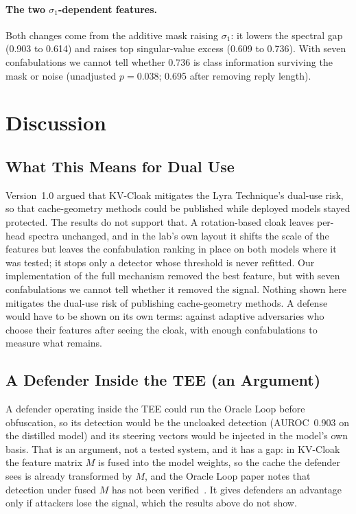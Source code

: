 \paragraph{The two $\sigma_1$-dependent features.}
Both changes come from the additive mask raising $\sigma_1$: it lowers
the spectral gap (0.903 to 0.614) and raises top singular-value excess
(0.609 to 0.736). With seven confabulations we cannot tell whether 0.736
is class information surviving the mask or noise (unadjusted $p = 0.038$;
0.695 after removing reply length).

\section{Discussion}

\subsection{What This Means for Dual Use}

Version~1.0 argued that KV-Cloak mitigates the Lyra Technique's dual-use
risk, so that cache-geometry methods could be published while deployed
models stayed protected. The results do not support that. A
rotation-based cloak leaves per-head spectra unchanged, and in the lab's
own layout it shifts the scale of the features but leaves the
confabulation ranking in place on both models where it was tested; it
stops only a detector whose threshold is never refitted. Our
implementation of the full mechanism removed the best feature, but with
seven confabulations we cannot tell whether it removed the signal.
Nothing shown here mitigates the dual-use risk of publishing
cache-geometry methods. A defense would have to be shown on its own
terms: against adaptive adversaries who choose their features after
seeing the cloak, with enough confabulations to measure what remains.

\subsection{A Defender Inside the TEE (an Argument)}

A defender operating inside the TEE could run the Oracle Loop before
obfuscation, so its detection would be the uncloaked detection (AUROC~0.903
on the distilled model) and its steering vectors would be injected in the
model's own basis. That is an argument, not a tested system, and it has a
gap: in KV-Cloak the feature matrix $M$ is fused into the model weights,
so the cache the defender sees is already transformed by $M$, and the
Oracle Loop paper notes that detection under fused $M$ has not been
verified~\citep{lyra2026oracle}. It gives defenders an advantage only if
attackers lose the signal, which the results above do not show.

